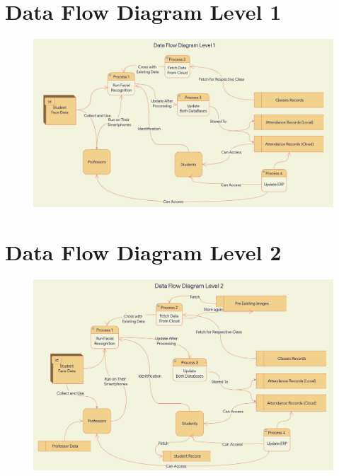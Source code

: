 \documentclass[11pt]{article}
\begin{document}
\section{Data Flow Diagram Level 1}

\begin{figure}[H]
    \begin{small}
        \begin{center}
            \includegraphics[scale=0.45]{dfd level 1.png}
        \end{center}
        \caption{}
        \label{fig:}
    \end{small}
\end{figure}


\section{Data Flow Diagram Level 2}

\begin{figure}[H]
    \begin{small}
        \begin{center}
            \includegraphics[scale=0.45]{dfd level 2.png}
        \end{center}
        \caption{}
        \label{fig:}
    \end{small}
\end{figure}
\end{document}
